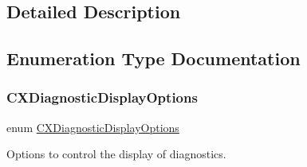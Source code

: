 \subsection{Detailed Description}


\subsection{Enumeration Type Documentation}
\mbox{\label{group__CINDEX__DIAG_ga0545c7c3ef36a397c44d142b0385b8d1}} 
\subsubsection{\texorpdfstring{C\+X\+Diagnostic\+Display\+Options}{CXDiagnosticDisplayOptions}}
{\footnotesize\ttfamily enum \hyperlink{group__CINDEX__DIAG_ga0545c7c3ef36a397c44d142b0385b8d1}{C\+X\+Diagnostic\+Display\+Options}}



Options to control the display of diagnostics. 

